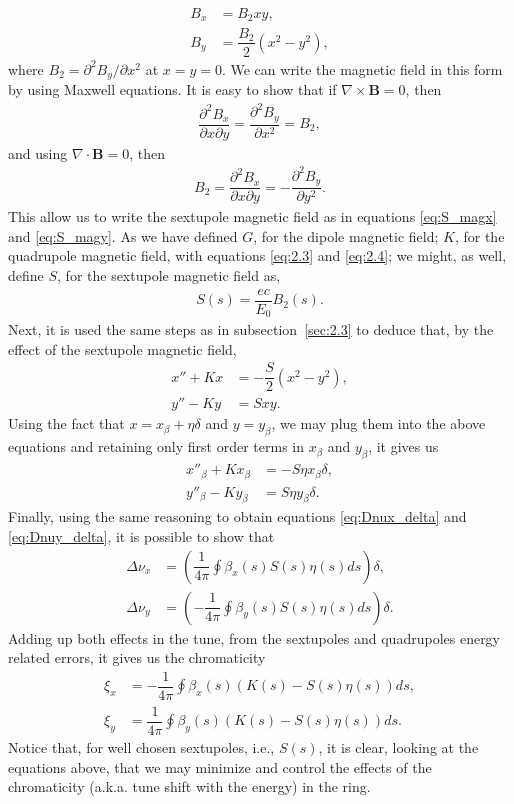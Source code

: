 \documentclass[../sands-adaptation.tex]{subfiles}
\begin{document}
\begin{align}
	B_x &= B_2 x y, \label{eq:S_magx} \\ 
    B_y &= \dfrac{B_2}{2} (x^2 - y^2),\label{eq:S_magy}
\end{align}
where $B_2 = \partial^2 B_y/\partial x^2$ at $x=y=0$. We can write the magnetic field in this form by using Maxwell equations. It is easy to show that if $\nabla \times \bm{B} = 0$, then
\begin{align*}
	\dfrac{\partial^2 B_x}{\partial x \partial y} = \dfrac{\partial^2 B_y}{\partial x^2} = B_2, 
\end{align*}
and using $\nabla \cdot \bm{B} = 0$, then
\begin{align*}
	B_2 = \dfrac{\partial^2 B_x}{\partial x \partial y} = - \dfrac{\partial^2 B_y}{\partial y^2}.
\end{align*}
This allow us to write the sextupole magnetic field as in equations \eqref{eq:S_magx} and \eqref{eq:S_magy}.
As we have defined $G$, for the dipole magnetic field; $K$, for the quadrupole magnetic field, with equations \eqref{eq:2.3} and \eqref{eq:2.4}; we might, as well, define $S$, for the sextupole magnetic field as,
\begin{align}
	S(s) = \dfrac{ec}{E_0} B_2(s).
\end{align}
Next, it is used the same steps as in subsection~\ref{sec:2.3} to deduce that, by the effect of the sextupole magnetic field,
\begin{align}
	x''+ K x &= - \dfrac{S}{2} (x^2 - y^2),\\
    y''- K y &= S x y.
\end{align}
Using the fact that $x = x_{\beta} + \eta \delta$ and $y = y_{\beta}$, we may plug them into the above equations and retaining only first order terms in $x_{\beta}$ and $y_{\beta}$, it gives us
\begin{align}
	x''_{\beta} + K x_{\beta} &= - S \eta x_{\beta} \delta, \\
    y''_{\beta} - K y_{\beta} &= S \eta y_{\beta} \delta.
\end{align}
Finally, using the same reasoning to obtain equations \eqref{eq:Dnux_delta} and \eqref{eq:Dnuy_delta}, it is possible to show that
\begin{align}
	\Delta\nu_x &= \left( \dfrac{1}{4\pi}\oint\beta_x(s) S(s)\eta(s) ds \right) \delta,\\
    \Delta\nu_y &= \left( -\dfrac{1}{4\pi}\oint\beta_y(s) S(s)\eta(s) ds \right) \delta.
\end{align}
Adding up both effects in the tune, from the sextupoles and quadrupoles energy related errors, it gives us the chromaticity
\begin{align}
	\xi_x &= -\dfrac{1}{4\pi}\oint\beta_x(s)(K(s) - S(s)\eta(s)) ds, \\
    \xi_y &= \dfrac{1}{4\pi}\oint\beta_y(s)(K(s) - S(s)\eta(s)) ds.
\end{align}
Notice that, for well chosen sextupoles, i.e., $S(s)$, it is clear, looking at the equations above, that we may minimize and control the effects of the chromaticity (a.k.a. tune shift with the energy) in the ring.
\end{document}
